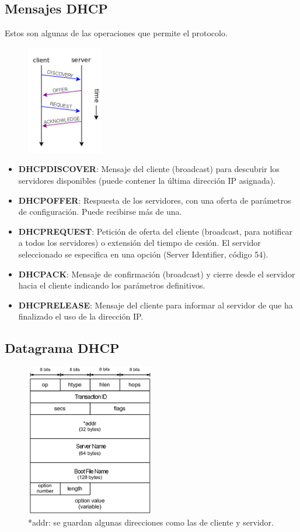 \subsection{Mensajes DHCP}
Estos son algunas de las operaciones que permite el protocolo.
\begin{figure}[H]
    \centering
    \includegraphics[width=0.3\textwidth]{img/DHCPmsgs.png}
\end{figure}

\begin{itemize}
    \item \textbf{DHCPDISCOVER}: Mensaje del cliente (broadcast) para descubrir los servidores disponibles (puede contener la última dirección IP asignada).
    \item \textbf{DHCPOFFER}: Respuesta de los servidores, con una oferta de parámetros de configuración. Puede
    recibirse más de una.
    \item \textbf{DHCPREQUEST}: Petición de oferta del cliente (broadcast, para notificar a todos los servidores) o extensión del tiempo de cesión. El servidor seleccionado se especifica en una opción (Server Identifier, código 54).
    \item \textbf{DHCPACK}: Mensaje de confirmación (broadcast) y cierre desde el servidor hacia el cliente indicando los parámetros definitivos.
    \item \textbf{DHCPRELEASE}: Mensaje del cliente para informar al servidor de que ha finalizado el uso de la dirección IP.
\end{itemize}
\subsection{Datagrama DHCP}
\begin{figure}[H]
    \centering
    \includegraphics[width=0.5\textwidth]{img/DHCPformat.jpg}
    \caption{*addr: se guardan algunas direcciones como las de cliente y servidor.}
\end{figure}
\newpage
